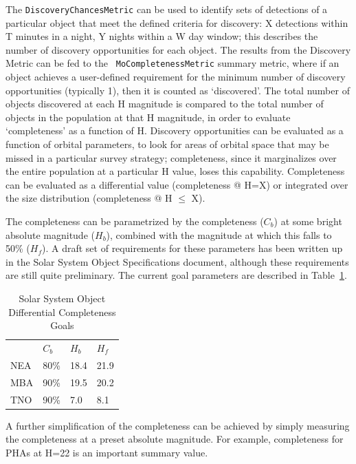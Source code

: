 The {\tt DiscoveryChancesMetric} can be used to identify sets of detections
of a particular object that meet the defined criteria for discovery: X
detections within T minutes in a night, Y nights within a W day
window; this describes the number of discovery opportunities for each object. The results from the Discovery Metric can be fed to the {\tt
  MoCompletenessMetric} summary metric, where if an object achieves a
user-defined requirement for the minimum number of discovery
opportunities (typically 1), then it is counted as `discovered'.
The total number of objects discovered at each H magnitude is compared
to the total number of objects in the population at that H magnitude,
in order to evaluate `completeness' as a function of H. Discovery
opportunities can be evaluated as a function of orbital parameters, to
look for areas of orbital space that may be missed in a particular
survey strategy; completeness, since it marginalizes over the entire
population at a particular H value, loses this
capability. Completeness can be evaluated as a differential value
(completeness @ H=X) or integrated over the size distribution
(completeness @ H $\leq$ X).

The completeness can be parametrized by the completeness ($C_b$) at
some bright absolute magnitude ($H_b$), combined with the magnitude at
which this falls to 50\% ($H_f$). A draft set of requirements for
these parameters has been written up in the Solar System Object
Specifications document, although these requirements are still quite
preliminary. The current goal parameters are described in Table~\ref{ssoreqs}.

\begin{table}[]
\centering
\caption{Solar System Object Differential Completeness Goals}
\label{ssoreqs}
\begin{tabular}{llll}
    & $C_b$ & $H_b$ & $H_f$ \\
NEA & 80\%  & 18.4  & 21.9  \\
MBA & 90\%  & 19.5  & 20.2  \\
TNO & 90\%  & 7.0   & 8.1
\end{tabular}
\end{table}

A further simplification of the completeness can be achieved by simply
measuring the completeness at a preset absolute magnitude. For
example, completeness for PHAs at H=22 is an important summary value.



